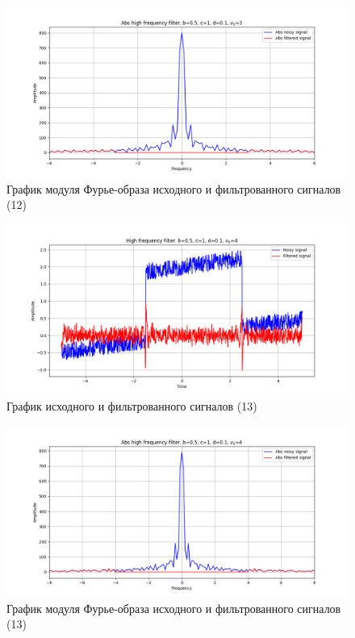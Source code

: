 \documentclass[a4paper, 12pt]{article}
\begin{document}
    \begin{figure}[!htb]
        \centering
        \includegraphics[scale=0.48]{12_abs_u_U_nolow.png}
        \captionsetup{skip=0pt}
        \caption{График модуля Фурье-образа исходного и фильтрованного сигналов (12)}
        \label{fig:fig50}
    \end{figure}
    \begin{figure}[!htb]
        \centering
        \includegraphics[scale=0.48]{13_u_flt_u_nolow.png}
        \captionsetup{skip=0pt}
        \caption{График исходного и фильтрованного сигналов (13)}
        \label{fig:fig51}
    \end{figure}
    \begin{figure}[!htb]
        \centering
        \includegraphics[scale=0.48]{13_abs_u_U_nolow.png}
        \captionsetup{skip=0pt}
        \caption{График модуля Фурье-образа исходного и фильтрованного сигналов (13)}
        \label{fig:fig52}
    \end{figure}
\end{document}
